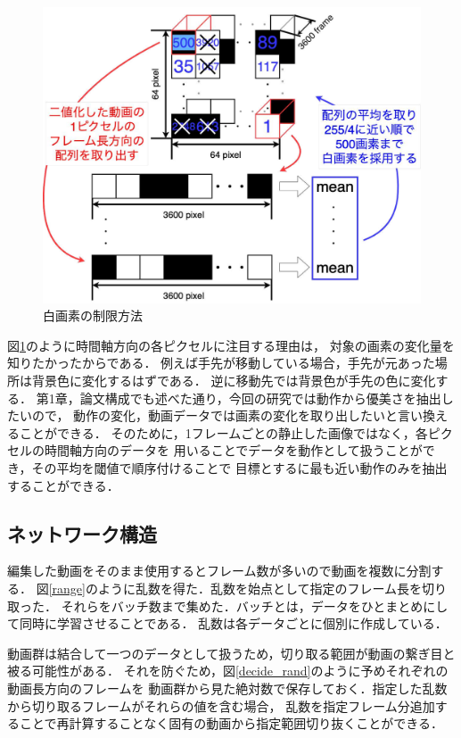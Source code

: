 \begin{figure}[t]
  \begin{center}
    \includegraphics[width=120mm]{images/chart/choice.pdf}
  \end{center}
  \caption{白画素の制限方法}
  \label{choice}
\end{figure}

図\ref{choice}のように時間軸方向の各ピクセルに注目する理由は，
対象の画素の変化量を知りたかったからである．
例えば手先が移動している場合，手先が元あった場所は背景色に変化するはずである．
逆に移動先では背景色が手先の色に変化する．
第1章，論文構成でも述べた通り，今回の研究では動作から優美さを抽出したいので，
動作の変化，動画データでは画素の変化を取り出したいと言い換えることができる．
そのために，1フレームごとの静止した画像ではなく，各ピクセルの時間軸方向のデータを
用いることでデータを動作として扱うことができ，その平均を閾値で順序付けることで
目標とするに最も近い動作のみを抽出することができる．
\clearpage

\subsection{ネットワーク構造}
編集した動画をそのまま使用するとフレーム数が多いので動画を複数に分割する．
図\ref{range}のように乱数を得た．乱数を始点として指定のフレーム長を切り取った．
それらをバッチ数まで集めた．バッチとは，データをひとまとめにして同時に学習させることである．
乱数は各データごとに個別に作成している．

動画群は結合して一つのデータとして扱うため，切り取る範囲が動画の繋ぎ目と被る可能性がある．
それを防ぐため，図\ref{decide_rand}のように予めそれぞれの動画長方向のフレームを
動画群から見た絶対数で保存しておく．指定した乱数から切り取るフレームがそれらの値を含む場合，
乱数を指定フレーム分追加することで再計算することなく固有の動画から指定範囲切り抜くことができる．


